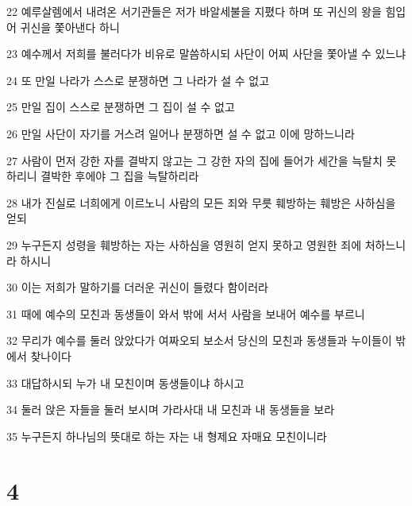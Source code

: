 \par 22 예루살렘에서 내려온 서기관들은 저가 바알세불을 지폈다 하며 또 귀신의 왕을 힘입어 귀신을 쫓아낸다 하니
\par 23 예수께서 저희를 불러다가 비유로 말씀하시되 사단이 어찌 사단을 쫓아낼 수 있느냐
\par 24 또 만일 나라가 스스로 분쟁하면 그 나라가 설 수 없고
\par 25 만일 집이 스스로 분쟁하면 그 집이 설 수 없고
\par 26 만일 사단이 자기를 거스려 일어나 분쟁하면 설 수 없고 이에 망하느니라
\par 27 사람이 먼저 강한 자를 결박지 않고는 그 강한 자의 집에 들어가 세간을 늑탈치 못하리니 결박한 후에야 그 집을 늑탈하리라
\par 28 내가 진실로 너희에게 이르노니 사람의 모든 죄와 무릇 훼방하는 훼방은 사하심을 얻되
\par 29 누구든지 성령을 훼방하는 자는 사하심을 영원히 얻지 못하고 영원한 죄에 처하느니라 하시니
\par 30 이는 저희가 말하기를 더러운 귀신이 들렸다 함이러라
\par 31 때에 예수의 모친과 동생들이 와서 밖에 서서 사람을 보내어 예수를 부르니
\par 32 무리가 예수를 둘러 앉았다가 여짜오되 보소서 당신의 모친과 동생들과 누이들이 밖에서 찾나이다
\par 33 대답하시되 누가 내 모친이며 동생들이냐 하시고
\par 34 둘러 앉은 자들을 둘러 보시며 가라사대 내 모친과 내 동생들을 보라
\par 35 누구든지 하나님의 뜻대로 하는 자는 내 형제요 자매요 모친이니라

\chapter{4}

